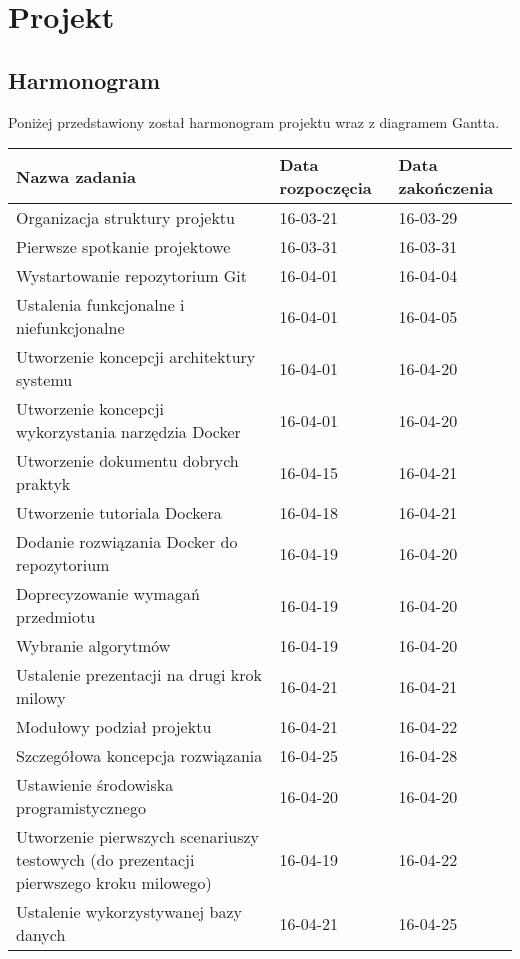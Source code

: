 \chapter{Projekt}


\section{Harmonogram}
Poniżej przedstawiony został harmonogram projektu wraz z diagramem Gantta.

  \begin{longtable}{| p{} || p{} | p{} |}
\hline
\textbf{Nazwa zadania} & \textbf{Data rozpoczęcia} & \textbf{Data zakończenia} \\ \hline
Organizacja struktury projektu & 16-03-21 & 16-03-29 \\ \hline
Pierwsze spotkanie projektowe & 16-03-31 & 16-03-31 \\ \hline
Wystartowanie repozytorium Git & 16-04-01 & 16-04-04 \\ \hline
Ustalenia funkcjonalne i niefunkcjonalne & 16-04-01 & 16-04-05 \\ \hline
Utworzenie koncepcji architektury systemu & 16-04-01 & 16-04-20 \\ \hline
Utworzenie koncepcji wykorzystania narzędzia Docker & 16-04-01 & 16-04-20 \\ \hline
Utworzenie dokumentu dobrych praktyk & 16-04-15 & 16-04-21 \\ \hline
Utworzenie tutoriala Dockera & 16-04-18 & 16-04-21 \\ \hline
Dodanie rozwiązania Docker do repozytorium & 16-04-19 & 16-04-20 \\ \hline
Doprecyzowanie wymagań przedmiotu & 16-04-19 & 16-04-20 \\ \hline
Wybranie algorytmów & 16-04-19 & 16-04-20 \\ \hline
Ustalenie prezentacji na drugi krok milowy & 16-04-21 & 16-04-21 \\ \hline
Modułowy podział projektu & 16-04-21 & 16-04-22 \\ \hline
Szczegółowa koncepcja rozwiązania & 16-04-25 & 16-04-28 \\ \hline
Ustawienie środowiska programistycznego & 16-04-20 & 16-04-20 \\ \hline
Utworzenie pierwszych scenariuszy testowych (do prezentacji pierwszego kroku milowego) & 16-04-19 & 16-04-22 \\ \hline
Ustalenie wykorzystywanej bazy danych & 16-04-21 & 16-04-25 \\ \hline

\end{longtable}
